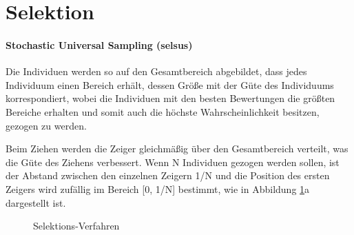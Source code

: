 \section{Selektion}\label{selection}


\paragraph{Stochastic Universal Sampling (selsus)} Die Individuen werden so auf
den Gesamtbereich abgebildet, dass jedes Individuum einen Bereich erhält, dessen
Größe mit der Güte des Individuums korrespondiert, wobei die Individuen mit den
besten Bewertungen die größten Bereiche erhalten und somit auch die höchste
Wahrscheinlichkeit besitzen, gezogen zu werden.

Beim Ziehen werden die Zeiger gleichmäßig über den Gesamtbereich verteilt, was
die Güte des Ziehens verbessert. Wenn N Individuen gezogen werden sollen, ist
der Abstand zwischen den einzelnen Zeigern 1/N und die Position des ersten
Zeigers wird zufällig im Bereich [0, 1/N] bestimmt, wie in Abbildung
\ref{fig.selection}a dargestellt ist.

\begin{figure}[!h] \centering
    \hfill
    \caption{Selektions-Verfahren \citep{mcl}}
    \label{fig.selection}
\end{figure}


